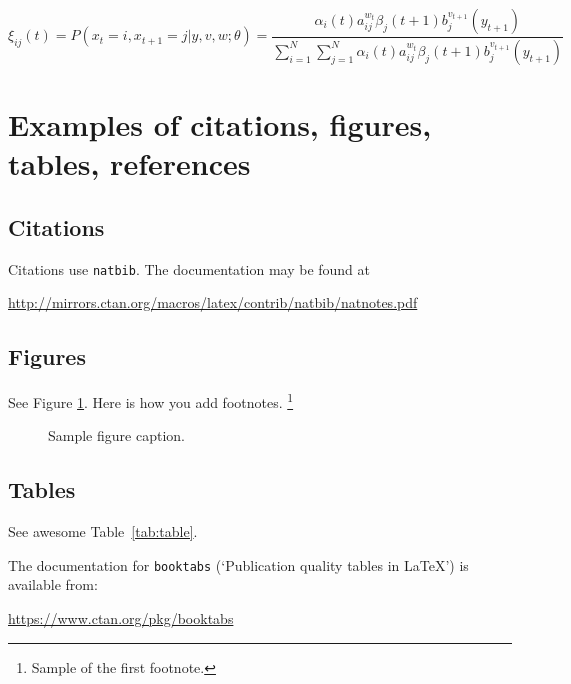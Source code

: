\documentclass{article}
\begin{document}
\begin{equation}
	\xi _{ij}(t)=P(x_{t}=i,x_{t+1}=j|y,v,w;\theta)= {\frac {\alpha _{i}(t)a^{w_t}_{ij}\beta _{j}(t+1)b^{v_{t+1}}_{j}(y_{t+1})}{\sum _{i=1}^{N} \sum _{j=1}^{N} \alpha _{i}(t)a^{w_t}_{ij}\beta _{j}(t+1)b^{v_{t+1}}_{j}(y_{t+1})}}
\end{equation}


\section{Examples of citations, figures, tables, references}
\label{sec:others}

\subsection{Citations}
Citations use \verb+natbib+. The documentation may be found at
\begin{center}
	\url{http://mirrors.ctan.org/macros/latex/contrib/natbib/natnotes.pdf}
\end{center}


\subsection{Figures}
\lipsum[10]
See Figure \ref{fig:fig1}. Here is how you add footnotes. \footnote{Sample of the first footnote.}
\lipsum[11]

\begin{figure}
	\centering
	\fbox{\rule[-.5cm]{4cm}{4cm} \rule[-.5cm]{4cm}{0cm}}
	\caption{Sample figure caption.}
	\label{fig:fig1}
\end{figure}

\subsection{Tables}
See awesome Table~\ref{tab:table}.

The documentation for \verb+booktabs+ (`Publication quality tables in LaTeX') is available from:
\begin{center}
	\url{https://www.ctan.org/pkg/booktabs}
\end{center}
\end{document}
